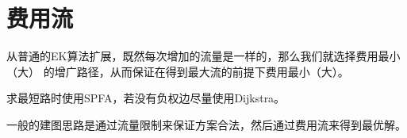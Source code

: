 \section{费用流}
从普通的EK算法扩展，既然每次增加的流量是一样的，那么我们就选择费用最小（大）
的增广路径，从而保证在得到最大流的前提下费用最小（大）。

求最短路时使用SPFA，若没有负权边尽量使用Dijkstra。

一般的建图思路是通过流量限制来保证方案合法，然后通过费用流来得到最优解。

